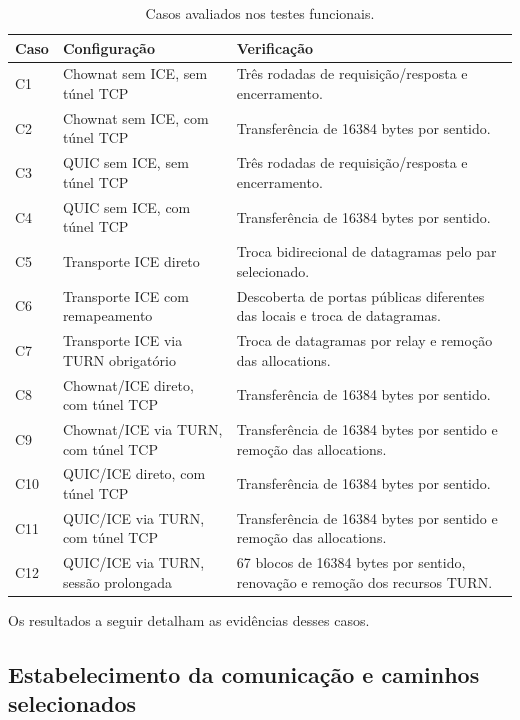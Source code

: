 \begin{table}[htbp]
    \centering
    \small
    \begin{tabular}{@{}p{}p{}p{}@{}}
        \toprule
        \textbf{Caso} & \textbf{Configuração} & \textbf{Verificação} \\
        \midrule
        C1 & Chownat sem ICE, sem túnel TCP & Três rodadas de requisição/resposta e encerramento. \\
        C2 & Chownat sem ICE, com túnel TCP & Transferência de 16384 bytes por sentido. \\
        C3 & QUIC sem ICE, sem túnel TCP & Três rodadas de requisição/resposta e encerramento. \\
        C4 & QUIC sem ICE, com túnel TCP & Transferência de 16384 bytes por sentido. \\
        C5 & Transporte ICE direto & Troca bidirecional de datagramas pelo par selecionado. \\
        C6 & Transporte ICE com remapeamento & Descoberta de portas públicas diferentes das locais e troca de datagramas. \\
        C7 & Transporte ICE via TURN obrigatório & Troca de datagramas por relay e remoção das allocations. \\
        C8 & Chownat/ICE direto, com túnel TCP & Transferência de 16384 bytes por sentido. \\
        C9 & Chownat/ICE via TURN, com túnel TCP & Transferência de 16384 bytes por sentido e remoção das allocations. \\
        C10 & QUIC/ICE direto, com túnel TCP & Transferência de 16384 bytes por sentido. \\
        C11 & QUIC/ICE via TURN, com túnel TCP & Transferência de 16384 bytes por sentido e remoção das allocations. \\
        C12 & QUIC/ICE via TURN, sessão prolongada & 67 blocos de 16384 bytes por sentido, renovação e remoção dos recursos TURN. \\
        \bottomrule
    \end{tabular}
    \caption{Casos avaliados nos testes funcionais.}
    \label{tab:functional_cases}
\end{table}

Os resultados a seguir detalham as evidências desses casos.

\subsection{Estabelecimento da comunicação e caminhos selecionados}
\label{sec:functional_establishment}

